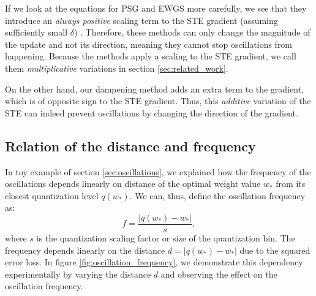 If we look at the equations for PSG and EWGS more carefully, we see that they introduce an \textit{always positive} scaling term to the STE gradient (assuming sufficiently small $\delta$) . Therefore, these methods can only change the magnitude of the update and not its direction, meaning they cannot stop oscillations from happening. Because the methods apply a  scaling to the STE gradient, we call them \textit{multiplicative} variations in section \ref{sec:related_work}. 

On the other hand, our dampening method adds an extra term to the gradient, which is of opposite sign to the STE gradient. Thus, this \textit{additive} variation of the STE can indeed prevent oscillations by changing the direction of the gradient.






\subsection{Relation of the distance and frequency}
\label{app:relation_distance_frequency}

In toy example of section \ref{sec:oscillations}, we explained how the frequency of the oscillations depends linearly on distance of the optimal weight value $w_*$ from its closest quantization level $q(w_*)$. We can, thus, define the oscillation frequency as:
\begin{equation}
    f = \frac{|q(w_*) - w_*|}{s},
    \label{eq:toy_example_freq}
\end{equation}
where $s$ is the quantization scaling factor or size of the quantization bin. The frequency depends linearly on the distance $d= |q(w_*) - w_*|$ due to the squared error loss. In figure \ref{fig:oscillation_frequency}, we demonstrate this dependency experimentally by varying the distance $d$ and observing the effect on the oscillation frequency.

